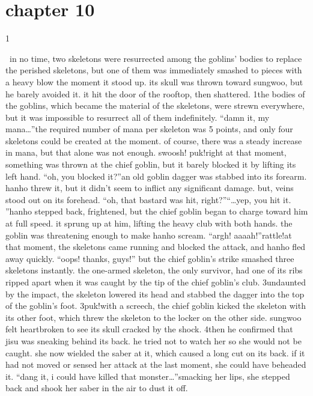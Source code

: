 \section{chapter 10}

                            1




 in no time, two skeletons were resurrected among the goblins’ bodies to replace the perished skeletons, but one of them was immediately smashed to pieces with a heavy blow the moment it stood up.
 its skull was thrown toward sungwoo, but he barely avoided it.
 it hit the door of the rooftop, then shattered.
1the bodies of the goblins, which became the material of the skeletons, were strewn everywhere, but it was impossible to resurrect all of them indefinitely.
“damn it, my mana…”the required number of mana per skeleton was 5 points, and only four skeletons could be created at the moment.
 of course, there was a steady increase in mana, but that alone was not enough.
swoosh! puk!right at that moment, something was thrown at the chief goblin, but it barely blocked it by lifting its left hand.
“oh, you blocked it?”an old goblin dagger was stabbed into its forearm.
 hanho threw it, but it didn’t seem to inflict any significant damage.
but, veins stood out on its forehead.
“oh, that bastard was hit, right?”“…yep, you hit it.
”hanho stepped back, frightened, but the chief goblin began to charge toward him at full speed.
 it sprung up at him, lifting the heavy club with both hands.
 the goblin was threatening enough to make hanho scream.
“argh! aaaah!”rattle!at that moment, the skeletons came running and blocked the attack, and hanho fled away quickly.
“oops! thanks, guys!”
but the chief goblin’s strike smashed three skeletons instantly.
 the one-armed skeleton, the only survivor, had one of its ribs ripped apart when it was caught by the tip of the chief goblin’s club.
3undaunted by the impact, the skeleton lowered its head and stabbed the dagger into the top of the goblin’s foot.
3puk!with a screech, the chief goblin kicked the skeleton with its other foot, which threw the skeleton to the locker on the other side.
 sungwoo felt heartbroken to see its skull cracked by the shock.
4then he confirmed that jisu was sneaking behind its back.
 he tried not to watch her so she would not be caught.
she now wielded the saber at it, which caused a long cut on its back.
 if it had not moved or sensed her attack at the last moment, she could have beheaded it.
“dang it, i could have killed that monster…”smacking her lips, she stepped back and shook her saber in the air to dust it off.
